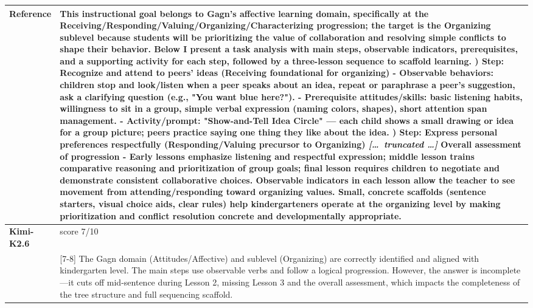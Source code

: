 \begin{longtable}{@{}l p{12.5cm}@{}}
  \textbf{Reference} & This instructional goal belongs to Gagn's affective learning domain, specifically at the Receiving/Responding/Valuing/Organizing/Characterizing progression; the target is the Organizing sublevel because students will be prioritizing the value of collaboration and resolving simple conflicts to shape their behavior. Below I present a task analysis with main steps, observable indicators, prerequisites, and a supporting activity for each step, followed by a three-lesson sequence to scaffold learning. \newline 1) Step: Recognize and attend to peers' ideas (Receiving foundational for organizing) \newline - Observable behaviors: children stop and look/listen when a peer speaks about an idea, repeat or paraphrase a peer's suggestion, ask a clarifying question (e.g., "You want blue here?"). \newline - Prerequisite attitudes/skills: basic listening habits, willingness to sit in a group, simple verbal expression (naming colors, shapes), short attention span management. \newline - Activity/prompt: "Show-and-Tell Idea Circle" --- each child shows a small drawing or idea for a group picture; peers practice saying one thing they like about the idea. \newline 2) Step: Express personal preferences respectfully (Responding/Valuing precursor to Organizing) \newline \textit{[\ldots\ truncated \ldots]} \newline Overall assessment of progression \newline - Early lessons emphasize listening and respectful expression; middle lesson trains comparative reasoning and prioritization of group goals; final lesson requires children to negotiate and demonstrate consistent collaborative choices. Observable indicators in each lesson allow the teacher to see movement from attending/responding toward organizing values. Small, concrete scaffolds (sentence starters, visual choice aids, clear rules) help kindergarteners operate at the organizing level by making prioritization and conflict resolution concrete and developmentally appropriate. \\
  \midrule
  \textbf{Kimi-K2.6} & score 7/10 \\
  & [7-8] The Gagn domain (Attitudes/Affective) and sublevel (Organizing) are correctly identified and aligned with kindergarten level. The main steps use observable verbs and follow a logical progression. However, the answer is incomplete---it cuts off mid-sentence during Lesson 2, missing Lesson 3 and the overall assessment, which impacts the completeness of the tree structure and full sequencing scaffold. \\

\end{longtable}
